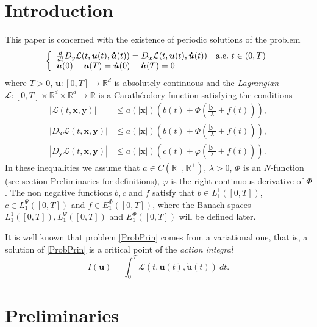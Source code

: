\documentclass[twoside]{article}
\theoremstyle{remark}
\newcommand{\lpsi}{L^{\Psi}}
\newcommand{\ephi}{E^{\Phi}}
\renewcommand{\b}[1]{\boldsymbol{#1}}
\newcommand{\rr}{\mathbb{R}}
\renewcommand{\leq}{\leqslant}
\begin{document}
\section{Introduction}
This paper is concerned with the existence of periodic solutions of the problem
\begin{equation}\label{ProbPrin}
    \left\{%
\begin{array}{ll}
   \frac{d}{dt} D_{y}\mathcal{L}(t,\b{u}(t),\b{\dot{u}}(t))= D_{\b{x}}\mathcal{L}(t,\b{u}(t),\b{\dot{u}}(t)) \quad \hbox{a.e.}\ t \in (0,T)\\
    \b{u}(0)-\b{u}(T)=\b{\dot{u}}(0)-\b{\dot{u}}(T)=0
\end{array}%
\right.
\end{equation}
where $T>0$, $\b{u}:[0,T]\to\rr^d$ is absolutely continuous and the \emph{Lagrangian} $\mathcal{L}:[0,T]\times\rr^d\times\rr^d\to\rr$ is a Carath\'eodory function satisfying the conditions
\begin{eqnarray}
|\mathcal{L}(t,\b{x},\b{y})| &\leq a(|\b{x}|)\left(b(t)+ \Phi\left(\frac{|\b{y}|}{\lambda}+f(t) \right)\right),\label{cotaL}\\
|D_{\b{x}}\mathcal{L}(t,\b{x},\b{y})| &\leq a(|\b{x}|)\left(b(t)+ \Phi\left(\frac{|\b{y}|}{\lambda}+f(t) \right)\right),\label{cotaDxL}\\
|D_{\b{y}}\mathcal{L}(t,\b{x},\b{y})| &\leq a(|\b{x}|)\left(c(t)+ \varphi\left(\frac{|\b{y}|}{\lambda}+f(t)\right)  \right).\label{cotaDyL}
\end{eqnarray}
In these inequalities we assume that  $a\in C(\mathbb{R}^+,\mathbb{R}^+)$, $\lambda>0$, $\Phi$ is an $N$-function (see section  Preliminaries  for definitions), $\varphi$ is the right continuous derivative of $\Phi$. The non negative functions $b,c$ and $f$ satisfy that  $b\in L^1_1([0,T]) $,  $c\in\lpsi_1([0,T])$ and  $f\in \ephi_1([0,T])$, where  the Banach spaces $ L^1_1([0,T]), \lpsi_1([0,T])$ and  $\ephi_1([0,T])$  will be defined later.


It is well known that problem \eqref{ProbPrin} comes from a variational one, that is,  a solution of \eqref{ProbPrin}  
is a critical point of the \emph{action integral}
\begin{equation}\label{integral_accion}
I(\b{u})=\int_{0}^T \mathcal{L}(t,\b{u}(t),\b{\dot{u}}(t))\ dt.
\end{equation}




\section{Preliminaries}\label{preliminares}
\end{document}

